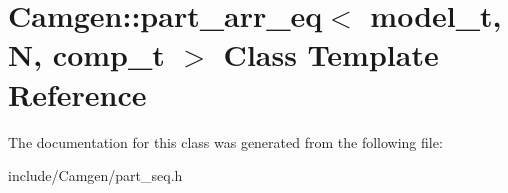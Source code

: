 \hypertarget{a00399}{}\section{Camgen\+:\+:part\+\_\+arr\+\_\+eq$<$ model\+\_\+t, N, comp\+\_\+t $>$ Class Template Reference}
\label{a00399}


The documentation for this class was generated from the following file\+:\begin{DoxyCompactItemize}
\item 
include/\+Camgen/part\+\_\+seq.\+h\end{DoxyCompactItemize}
